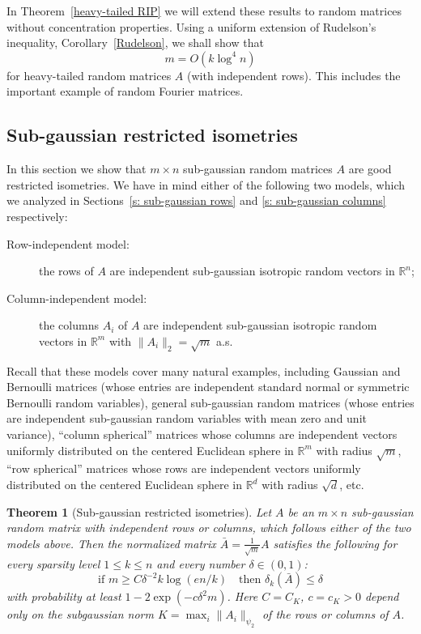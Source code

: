\documentclass[10pt, openany]{book}
\newtheorem{theorem}{Theorem}[chapter]
\theoremstyle{remark}
\def \R {\mathbb{R}}
\def \d {\delta}
\def \psitwo {{\psi_2}}
\begin{document}
In Theorem~\ref{heavy-tailed RIP} we will extend these results to random matrices without concentration properties. 
Using a uniform extension of Rudelson's inequality, Corollary~\ref{Rudelson}, we shall show that
\begin{equation}										\label{m heavy-tailed}
m = O(k \log^4 n)
\end{equation}
for heavy-tailed random matrices $A$ (with independent rows). This includes the important
example of random Fourier matrices.



\subsection{Sub-gaussian restricted isometries} 

In this section we show that $m \times n$ sub-gaussian random matrices $A$ are good restricted isometries. 
We have in mind either of the following two models, which we analyzed in Sections~\ref{s: sub-gaussian rows}
and \ref{s: sub-gaussian columns} respectively:
\begin{description}
  \item[Row-independent model:] the rows of $A$ are independent 
    sub-gaussian isotropic random vectors in $\R^n$;
  \item[Column-independent model:] the columns $A_i$ of $A$ are independent 
    sub-gaussian isotropic random vectors in $\R^m$ with $\|A_i\|_2 = \sqrt{m}$ a.s.
\end{description}
Recall that these models cover many natural examples, including Gaussian and Bernoulli matrices 
(whose entries are independent standard normal or symmetric Bernoulli random variables), 
general sub-gaussian random matrices (whose entries are independent sub-gaussian random variables 
with mean zero and unit variance),
``column spherical'' matrices whose columns are independent vectors uniformly distributed on the centered
Euclidean sphere in $\R^m$ with radius $\sqrt{m}$, 
``row spherical'' matrices whose rows are independent vectors uniformly distributed on the centered
Euclidean sphere in $\R^d$ with radius $\sqrt{d}$, etc.


\begin{theorem}[Sub-gaussian restricted isometries]					\label{sub-gaussian RIP}
  Let $A$ be an $m \times n$ sub-gaussian random matrix with independent rows or columns, 
  which follows either of the two models above.   
  Then the normalized matrix $\bar{A} = \frac{1}{\sqrt{m}} A$ satisfies the following for every 
  sparsity level $1 \le k \le n$ and every number $\d \in (0,1)$:
  $$
  \text{if } m \ge C \d^{-2} k \log (en/k)
  \quad \text{then } \d_k(\bar{A}) \le \d
  $$
  with probability at least $1 - 2\exp(-c \d^2 m)$. 
  Here $C = C_K$, $c = c_K > 0$ depend only on the subgaussian norm 
  $K = \max_i \|A_i\|_\psitwo$ of the rows or columns of $A$. 
\end{theorem}
\end{document}
